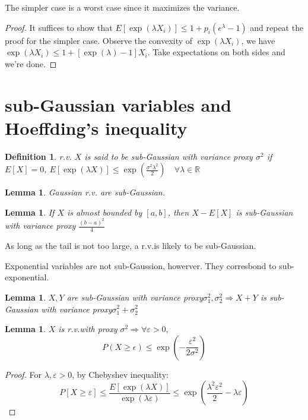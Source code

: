 \documentclass{book}
\newcommand{\R}{\mathbb{R}}
\newcommand{\rv}{r.v.}
\newtheorem{Lemma}[Thm]{Lemma}
\newtheorem{Def}{Definition}[section]
\begin{document}
The simpler case is a worst case since it maximizes the variance.

\begin{proof}
  It suffices to show  that $E[\exp(\lambda X_{i})]\leq 1+p_{i}(e^{\lambda}-1)$ and repeat the proof for the simpler case. Observe the convexity of $\exp(\lambda X_{i})$, we have $\exp(\lambda X_{i})\leq 1+[\exp(\lambda)-1]X_{i}$. Take expectations on both sides and we're done.
\end{proof}

\section{sub-Gaussian variables and Hoeffding's inequality}
\begin{Def}
  r.v. $X$ is said to be sub-Gaussian with variance proxy $\sigma^{2}$ if $E[X]=0$, $E[\exp(\lambda X)]\leq \exp(\frac{\sigma^{2}\lambda^{2}}{2})\quad \forall\lambda\in\R$
\end{Def}

\begin{Lemma}
  Gaussian r.v. are sub-Gaussian.
\end{Lemma}

\begin{Lemma}
  If $X$ is almost bounded by $[a,b]$, then $X-E[X]$ is sub-Gaussian with variance proxy $\frac{(b-a)^{2}}{4}$
\end{Lemma}

As long as the tail is not too large, a \rv is likely to be sub-Gaussian.

Exponential variables are not sub-Gaussion, howerver. They corresbond to sub-exponential.

\begin{Lemma}
  $X,Y$ are sub-Gaussian with variance proxy$\sigma_{1}^{2},\sigma_{2}^{2}\Rightarrow X+Y$ is sub-Gaussian with variance proxy$\sigma_{1}^{2}+\sigma_{2}^{2}$
\end{Lemma}

\begin{Lemma}
  $X$ is \rv with proxy $\sigma^{2}\Rightarrow\forall\varepsilon>0,$
  \[P(X\geq \epsilon)\leq\exp(-\frac{\varepsilon^{2}}{2\sigma^{2}})\]
\end{Lemma}
\begin{proof}
  For $\lambda,\varepsilon>0$, by Chebyshev inequality:
  \[P[X\geq\varepsilon]\leq\frac{E[\exp(\lambda X)]}{\exp(\lambda\varepsilon)}\leq\exp(\frac{\lambda^{2}\varepsilon^{2}}{2}-\lambda\varepsilon)\]
\end{proof}
\end{document}
